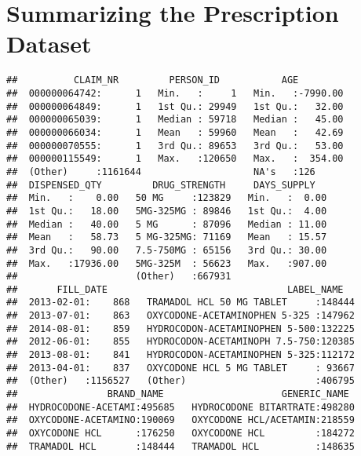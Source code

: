 \documentclass[]{article}
\newenvironment{Shaded}{\begin{snugshade}}{\end{snugshade}}
\newcommand{\KeywordTok}[1]{\textcolor[rgb]{0.13,0.29,0.53}{\textbf{#1}}}
\newcommand{\StringTok}[1]{\textcolor[rgb]{0.31,0.60,0.02}{#1}}
\newcommand{\CommentTok}[1]{\textcolor[rgb]{0.56,0.35,0.01}{\textit{#1}}}
\newcommand{\OperatorTok}[1]{\textcolor[rgb]{0.81,0.36,0.00}{\textbf{#1}}}
\newcommand{\NormalTok}[1]{#1}
\begin{document}
\section{Summarizing the Prescription
Dataset}\label{summarizing-the-prescription-dataset}

\begin{Shaded}
\end{Shaded}

\begin{verbatim}
##          CLAIM_NR         PERSON_ID           AGE          
##  000000064742:      1   Min.   :     1   Min.   :-7990.00  
##  000000064849:      1   1st Qu.: 29949   1st Qu.:   32.00  
##  000000065039:      1   Median : 59718   Median :   45.00  
##  000000066034:      1   Mean   : 59960   Mean   :   42.69  
##  000000070555:      1   3rd Qu.: 89653   3rd Qu.:   53.00  
##  000000115549:      1   Max.   :120650   Max.   :  354.00  
##  (Other)     :1161644                    NA's   :126       
##  DISPENSED_QTY         DRUG_STRENGTH     DAYS_SUPPLY    
##  Min.   :    0.00   50 MG     :123829   Min.   :  0.00  
##  1st Qu.:   18.00   5MG-325MG : 89846   1st Qu.:  4.00  
##  Median :   40.00   5 MG      : 87096   Median : 11.00  
##  Mean   :   58.73   5 MG-325MG: 71169   Mean   : 15.57  
##  3rd Qu.:   90.00   7.5-750MG : 65156   3rd Qu.: 30.00  
##  Max.   :17936.00   5MG-325M  : 56623   Max.   :907.00  
##                     (Other)   :667931                   
##       FILL_DATE                                LABEL_NAME    
##  2013-02-01:    868   TRAMADOL HCL 50 MG TABLET     :148444  
##  2013-07-01:    863   OXYCODONE-ACETAMINOPHEN 5-325 :147962  
##  2014-08-01:    859   HYDROCODON-ACETAMINOPHEN 5-500:132225  
##  2012-06-01:    855   HYDROCODON-ACETAMINOPH 7.5-750:120385  
##  2013-08-01:    841   HYDROCODON-ACETAMINOPHEN 5-325:112172  
##  2013-04-01:    837   OXYCODONE HCL 5 MG TABLET     : 93667  
##  (Other)   :1156527   (Other)                       :406795  
##                BRAND_NAME                     GENERIC_NAME   
##  HYDROCODONE-ACETAMI:495685   HYDROCODONE BITARTRATE:498280  
##  OXYCODONE-ACETAMINO:190069   OXYCODONE HCL/ACETAMIN:218559  
##  OXYCODONE HCL      :176250   OXYCODONE HCL         :184272  
##  TRAMADOL HCL       :148444   TRAMADOL HCL          :148635  

\end{verbatim}
\end{document}
